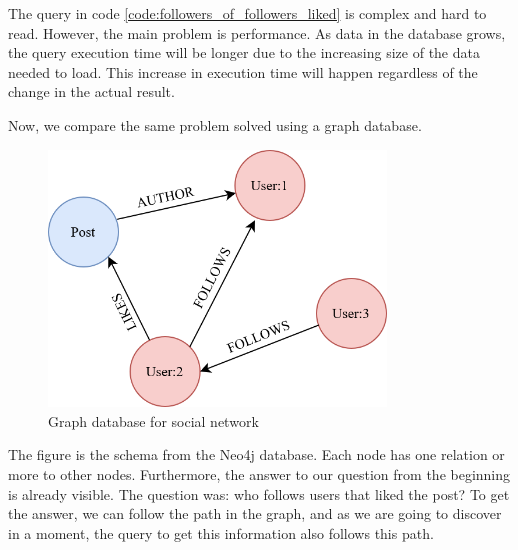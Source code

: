 
The query in code \ref{code:followers_of_followers_liked} is complex and hard to read. However, the main problem is performance.
As data in the database grows, the query execution time will be longer due to the increasing size of the data needed to load.
This increase in execution time will happen regardless of the change in the actual result.

Now, we compare the same problem solved using a graph database.

\begin{figure}[H]
    \centering
    \includegraphics[width=0.8\textwidth]{content/graph_example.png}
    \caption{Graph database for social network}
    \label{fig:graphscheme}
\end{figure}

The figure \label{fig:graphscheme} is the schema from the Neo4j database.
Each node has one relation or more to other nodes.
Furthermore, the answer to our question from the beginning is already visible. The question was: who follows users that liked the post?
To get the answer, we can follow the path in the graph, and as we are going to discover in a moment, the query to get this information also follows this path.


